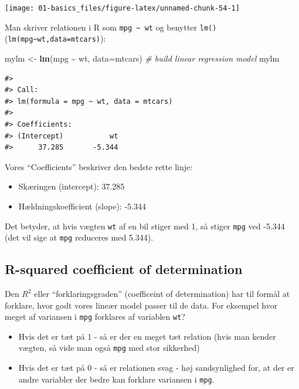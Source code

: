 \documentclass[
]{book}
\newenvironment{Shaded}{\begin{snugshade}}{\end{snugshade}}
\newcommand{\AttributeTok}[1]{\textcolor[rgb]{0.27,0.27,0.27}{#1}}
\newcommand{\CommentTok}[1]{\textcolor[rgb]{0.37,0.37,0.37}{\textit{#1}}}
\newcommand{\FunctionTok}[1]{\textcolor[rgb]{0.27,0.27,0.27}{\textbf{#1}}}
\newcommand{\NormalTok}[1]{#1}
\newcommand{\OtherTok}[1]{\textcolor[rgb]{0.37,0.37,0.37}{#1}}
\newcommand{\SpecialCharTok}[1]{\textcolor[rgb]{0.43,0.43,0.43}{\textbf{#1}}}
\providecommand{\tightlist}{%
  \setlength{\itemsep}{0pt}\setlength{\parskip}{0pt}}
\begin{document}
\begin{center}\texttt{[image: 01-basics\_files/figure-latex/unnamed-chunk-54-1]} \end{center}

Man skriver relationen i R som \texttt{mpg\ \textasciitilde{}\ wt} og benytter \texttt{lm()}(\texttt{lm(mpg\textasciitilde{}wt,data=mtcars)}):

\begin{Shaded}
\begin{Highlighting}[]
\NormalTok{mylm }\OtherTok{\textless{}{-}} \FunctionTok{lm}\NormalTok{(mpg }\SpecialCharTok{\textasciitilde{}}\NormalTok{ wt, }\AttributeTok{data=}\NormalTok{mtcars)  }\CommentTok{\# build linear regression model}
\NormalTok{mylm}
\end{Highlighting}
\end{Shaded}

\begin{verbatim}
#> 
#> Call:
#> lm(formula = mpg ~ wt, data = mtcars)
#> 
#> Coefficients:
#> (Intercept)           wt  
#>      37.285       -5.344
\end{verbatim}

Vores ``Coefficients'' beskriver den bedste rette linje:

\begin{itemize}
\tightlist
\item
  Skæringen (intercept): 37.285
\item
  Hældningskoefficient (slope): -5.344
\end{itemize}

Det betyder, at hvis vægten \texttt{wt} af en bil stiger med 1, så stiger \texttt{mpg} ved -5.344 (det vil sige at \texttt{mpg} reduceres med 5.344).

\subsection{R-squared coefficient of determination}\label{r-squared-coefficient-of-determination}

Den \(R^2\) eller ``forklaringsgraden'' (coefficeint of determination) har til formål at forklare, hvor godt vores lineær model passer til de data. For eksempel hvor meget af variansen i \texttt{mpg} forklares af variablen \texttt{wt}?

\begin{itemize}
\tightlist
\item
  Hvis det er tæt på 1 - så er der en meget tæt relation (hvis man kender vægten, så vide man også \texttt{mpg} med stor sikkerhed)
\item
  Hvis det er tæt på 0 - så er relationen svag - høj sandsynlighed for, at der er andre variabler der bedre kan forklare variansen i \texttt{mpg}.
\end{itemize}
\end{document}
